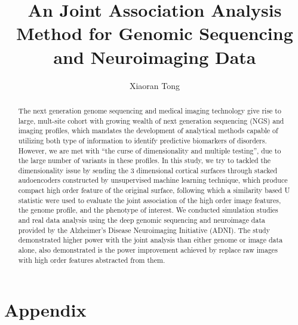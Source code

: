 \documentclass[12pt]{article}
\author{Xiaoran Tong}
\begin{document}
\title{An Joint Association Analysis Method for Genomic Sequencing and Neuroimaging Data}
\maketitle

\begin{abstract}
The next generation genome sequencing and medical imaging technology give rise to large, mult-site cohort with growing wealth of next generation sequencing (NGS) and imaging profiles, which mandates the development of analytical methods capable of utilizing both type of information to identify predictive biomarkers of disorders. However, we are met with “the curse of dimensionality and multiple testing”, due to the large number of variants in these profiles. In this study, we try to tackled the dimensionality issue by sending the 3 dimensional cortical surfaces through stacked audoencoders constructed by unsupervised machine learning technique, which produce compact high order feature of the original surface, following which a similarity based U statistic were used to evaluate the joint association of the high order image features, the genome profile, and the phenotype of interest.
We conducted simulation studies and real data analysis using the deep genomic sequencing and neuroimage data provided by the Alzheimer’s Disease Neuroimaging Initiative (ADNI). The study demonstrated higher power with the joint analysis than either genome or image data alone, also demonstrated is the power improvement achieved by replace raw images with high order features abstracted from them. 
\end{abstract}






\printbibliography

\section{Appendix}


\end{document}
